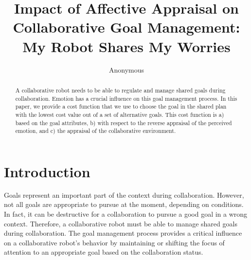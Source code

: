 \documentclass[conference]{IEEEtran}
\begin{document}
\title{{\fontsize{19}{20}\selectfont Impact of Affective Appraisal on
Collaborative Goal Management:\\My Robot Shares My Worries}}


\author{Anonymous}

\maketitle

\begin{abstract}
A collaborative robot needs to be able to regulate and manage shared goals
during collaboration. Emotion has a crucial influence on this goal management
process. In this paper, we provide a cost function that we use to choose the
goal in the shared plan with the lowest cost value out of a set of alternative
goals. This cost function is a) based on the goal attributes, b) with respect to
the reverse appraisal of the perceived emotion, and c) the appraisal of the
collaborative environment.
\end{abstract}

\IEEEpeerreviewmaketitle

\vspace*{-2mm}
\section{Introduction}
\vspace*{-2mm}
Goals represent an important part of the context during collaboration. However,
not all goals are appropriate to pursue at the moment, depending on conditions.
In fact, it can be destructive for a collaboration to pursue a good goal in a
wrong context. Therefore, a collaborative robot must be able to manage shared
goals during collaboration. The goal management process provides a critical
influence on a collaborative robot's behavior by maintaining or shifting the
focus of attention to an appropriate goal based on the collaboration status.
\end{document}
